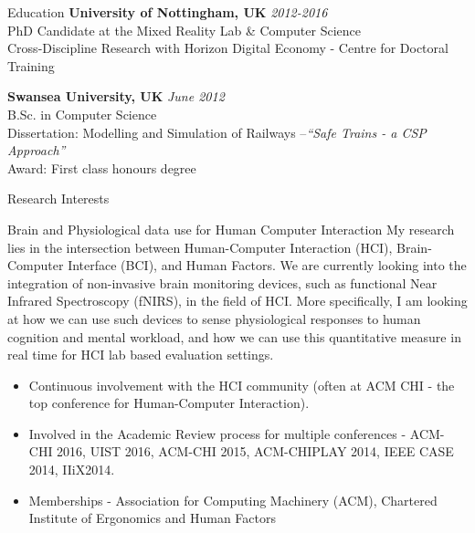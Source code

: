 \documentclass{resume} %
\begin{document}

\begin{rSection}{Education}
{\bf University of Nottingham, UK} \hfill {\em 2012-2016} \\
PhD Candidate at the Mixed Reality Lab \& Computer Science \\
Cross-Discipline Research with Horizon Digital Economy - Centre for Doctoral Training \smallskip \\
\vspace{-1 mm}

{\bf Swansea University, UK} \hfill {\em June 2012} \\
B.Sc. in Computer Science \\
Dissertation: Modelling and Simulation of Railways –\emph{``Safe Trains - a CSP Approach''}\smallskip \\
Award: First class honours degree

\end{rSection}

\begin{rSection}{Research Interests}
\begin{rSubsection}{Brain and Physiological data use for Human Computer Interaction}{ }{ }{ }
\vspace{-5 mm}
My research lies in the intersection between Human-Computer Interaction (HCI), Brain-Computer
Interface (BCI), and Human Factors. We are currently looking into the integration of non-invasive
brain monitoring devices, such as functional Near Infrared Spectroscopy (fNIRS), in the field of HCI.
More specifically, I am looking at how we can use such devices to sense physiological responses to
human cognition and mental workload, and how we can use this quantitative measure in real time for HCI lab based evaluation settings.

\begin{itemize}
  \item Continuous involvement with the HCI community (often at ACM CHI - the top conference for Human-Computer Interaction).
  \item Involved in the Academic Review process for multiple conferences - ACM-CHI 2016, UIST 2016, ACM-CHI 2015, ACM-CHIPLAY 2014, IEEE CASE 2014, IIiX2014.
  \item  Memberships - Association for Computing Machinery (ACM), Chartered Institute of Ergonomics and Human Factors
\end{itemize}

\end{rSubsection}

\end{rSection}
\end{document}
